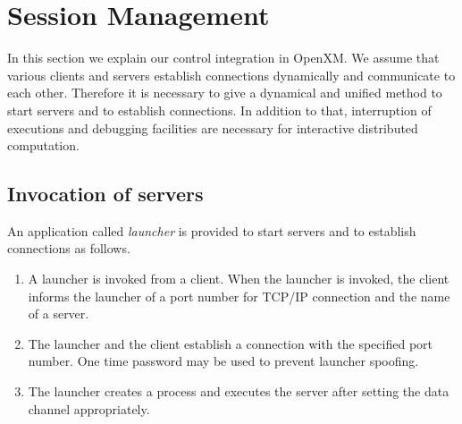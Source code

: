 
\section{Session Management}
\label{secsession}
 
In this section we explain our control integration in
OpenXM.  We assume that various clients and servers
establish connections dynamically and communicate to each
other. Therefore it is necessary to give a dynamical and unified
method to start servers and to establish connections.
In addition to that, interruption of executions and 
debugging facilities
are necessary for interactive distributed computation.

%

\subsection{Invocation of servers}
\label{launcher}

An application called {\it launcher} is provided to start servers
and to establish connections as follows.

\begin{enumerate}
\item A launcher is invoked from a client.
When the launcher is invoked, the client 
informs the launcher of a port number for TCP/IP connection
and the name of a server.
\item The launcher and the client establish a connection with the
specified port number. One time password may be used to prevent
launcher spoofing.
\item The launcher creates a process and executes the server after
setting the data channel appropriately.
\end{enumerate}

